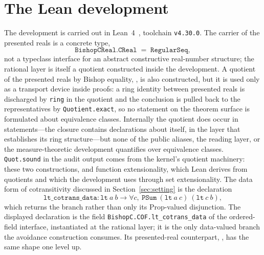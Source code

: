 \documentclass[11pt]{article}
\theoremstyle{definition}
\theoremstyle{remark}
\begin{document}
\section{The Lean development}
\label{sec:formalization}

The development is carried out in Lean~4~\cite{lean4-2021}, toolchain \texttt{v4.30.0}.  The carrier of the presented reals is a concrete type,
\[
\texttt{BishopCReal.CReal} \;=\; \texttt{RegularSeq},
\]
not a typeclass interface for an abstract constructive real-number structure; the rational layer is itself a quotient constructed inside the development.  A quotient of the presented reals by Bishop equality, , is also constructed, but it is used only as a transport device inside proofs: a ring identity between presented reals is discharged by \texttt{ring} in the quotient and the conclusion is pulled back to the representatives by \texttt{Quotient.exact}, so no statement on the theorem surface is formulated about equivalence classes.  Internally the quotient does occur in statements---the closure contains declarations about  itself, in the layer that establishes its ring structure---but none of the public aliases, the reading layer, or the measure-theoretic development quantifies over equivalence classes.  \texttt{Quot.sound} in the audit output comes from the kernel's quotient machinery: these two constructions, and function extensionality, which Lean derives from quotients and which the development uses through set extensionality.  The data form of cotransitivity discussed in Section~\ref{sec:setting} is the declaration
\[
\texttt{lt\_cotrans\_data} : \texttt{lt}\ a\ b \to \forall c,\ \texttt{PSum}\ (\texttt{lt}\ a\ c)\ (\texttt{lt}\ c\ b),
\]
which returns the branch rather than only its Prop-valued disjunction.  The displayed declaration is the field \texttt{BishopC.COF.lt\_cotrans\_data} of the ordered-field interface, instantiated at the rational layer; it is the only data-valued branch the avoidance construction consumes.  Its presented-real counterpart, , has the same shape one level up.
\end{document}
